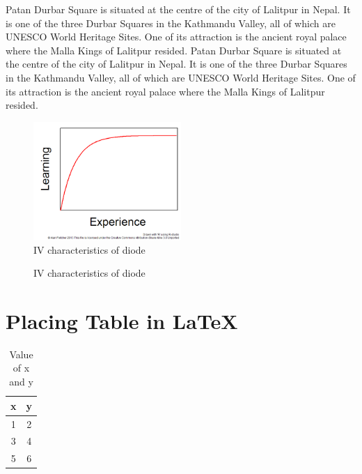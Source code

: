 \documentclass[12pt]{report}
\begin{document}
Patan Durbar Square is situated at the centre of the city of Lalitpur in Nepal. It is one of the three Durbar Squares in the Kathmandu Valley, all of which are UNESCO World Heritage Sites. One of its attraction is the ancient royal palace where the Malla Kings of Lalitpur resided.
Patan Durbar Square is situated at the centre of the city of Lalitpur in Nepal. It is one of the three Durbar Squares in the Kathmandu Valley, all of which are UNESCO World Heritage Sites. One of its attraction is the ancient royal palace where the Malla Kings of Lalitpur resided.



\begin{figure}[!hbt]
  
  \centering
    \includegraphics[width=0.5\textwidth]{figure1.png}
    \caption{IV characteristics of diode}
\end{figure}

\begin{figure}[!hbt]
  \centering
  \caption{IV characteristics of diode}
\end{figure}

\section{Placing Table in \LaTeX}

\begin{table}[!hbt]
\centering
\caption{Value of x and y}
\begin{tabular}{|c|c|}
\hline
x & y\\
\hline
1 & 2\\
\hline
3 & 4\\
\hline
5 & 6\\
\hline
\end{tabular}
\end{table}
\end{document}
